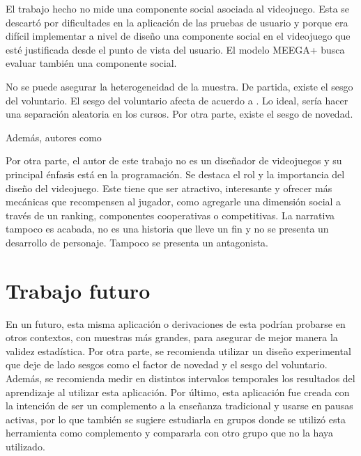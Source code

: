 El trabajo hecho no mide una componente social asociada al videojuego. Esta se descartó por dificultades en la aplicación de las pruebas de usuario y porque era difícil implementar a nivel de diseño una componente social en el videojuego que esté justificada desde el punto de vista del usuario. El modelo MEEGA+ \cite{meegaplus} busca evaluar también una componente social.

No se puede asegurar la heterogeneidad de la muestra. De partida, existe el sesgo del voluntario. El sesgo del voluntario afecta de acuerdo a \cite{}. Lo ideal, sería hacer una separación aleatoria en los cursos. %
Por otra parte, existe el sesgo de novedad. %

Además, autores como %

Por otra parte, el autor de este trabajo no es un diseñador de videojuegos y su principal énfasis está en la programación. Se destaca el rol y la importancia del diseño del videojuego. Este tiene que ser atractivo, interesante y ofrecer más mecánicas que recompensen al jugador, como agregarle una dimensión social a través de un ranking, componentes cooperativas o competitivas. La narrativa tampoco es acabada, no es una historia que lleve un fin y no se presenta un desarrollo de personaje. Tampoco se presenta un antagonista.

\section{Trabajo futuro}


En un futuro, esta misma aplicación o derivaciones de esta podrían probarse en otros contextos, con muestras más grandes, para asegurar de mejor manera la validez estadística. Por otra parte, se recomienda utilizar un diseño experimental que deje de lado sesgos como el factor de novedad y el sesgo del voluntario. Además, se recomienda medir en distintos intervalos temporales los resultados del aprendizaje al utilizar esta aplicación. Por último, esta aplicación fue creada con la intención de ser un complemento a la enseñanza tradicional y usarse en pausas activas, por lo que también se sugiere estudiarla en grupos donde se utilizó esta herramienta como complemento y compararla con otro grupo que no la haya utilizado.

